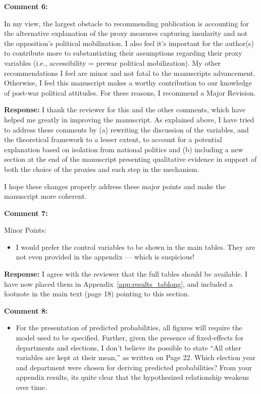 \documentclass[12pt, a4paper, notitlepage]{article}
\begin{document}
\vspace{15pt}
\noindent\textbf{Comment 6:}
\begin{displayquote}
In my view, the largest obstacle to recommending publication is accounting for the alternative explanation of the proxy measures capturing insularity and not the opposition’s political mobilization. I also feel it’s important for the author(s) to contribute more to substantiating their assumptions regarding their proxy variables (i.e., accessibility = prewar political mobilization). My other recommendations I feel are minor and not fatal to the manuscripts advancement. Otherwise, I feel this manuscript makes a worthy contribution to our knowledge of post-war political attitudes. For these reasons, I recommend a Major Revision.
\end{displayquote}

\noindent\textbf{Response:} I thank the reviewer for this and the other comments, which have helped me greatly in improving the manuscript. As explained above, I have tried to address these comments by (a) rewriting the discussion of the variables, and the theoretical framework to a lesser extent, to account for a potential explanation based on isolation from national politics and (b) including a new section at the end of the manuscript presenting qualitative evidence in support of both the choice of the proxies and each step in the mechanism.

I hope these changes properly address these major points and make the manuscript more coherent.

\vspace{15pt}
\noindent\textbf{Comment 7:}
\begin{displayquote}
Minor Points:
\begin{itemize}
\item I would prefer the control variables to be shown in the main tables. They are not even provided in the appendix — which is suspicious!
\end{itemize}
\end{displayquote}

\noindent\textbf{Response:} I agree with the reviewer that the full tables should be available. I have now placed them in Appendix~\ref{app:results_tablong}, and included a footnote in the main text (page 18) pointing to this section.

\vspace{15pt}
\noindent\textbf{Comment 8:}
\begin{displayquote}
\begin{itemize}
\item For the presentation of predicted probabilities, all figures will require the model used to be specified. Further, given the presence of fixed-effects for departments and elections, I don’t believe its possible to state “All other variables are kept at their mean,” as written on Page 22. Which election year and department were chosen for deriving predicted probabilities? From your appendix results, its quite clear that the hypothesized relationship weakens over time.
\end{itemize}
\end{displayquote}
\end{document}
